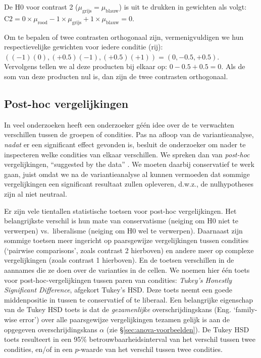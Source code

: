 \documentclass[
]{book}
\begin{document}
De H0 voor contrast 2 (\(\mu_\textrm{grijs} = \mu_\textrm{blauw}\)) is uit
te drukken in gewichten als volgt:
\(\textrm{C2} = 0\times \mu_\textrm{rood} -1 \times \mu_\textrm{grijs} +1 \times \mu_\textrm{blauw} = 0\).

Om te bepalen of twee contrasten orthogonaal zijn, vermenigvuldigen we
hun respectievelijke gewichten voor iedere conditie (rij):\\
\(( (-1)(0), (+0.5)(-1), (+0.5)(+1) )= (0, -0.5, +0.5)\).\\
Vervolgens tellen we al deze producten bij elkaar op:
\(0 -0.5 + 0.5 = 0\). Als de som van deze producten nul is, dan zijn de
twee contrasten orthogonaal.

\hypertarget{sec:anova-oneway-posthoc}{%
\subsection{Post-hoc vergelijkingen}\label{sec:anova-oneway-posthoc}}

In veel onderzoeken heeft een onderzoeker géén idee over de te
verwachten verschillen tussen de groepen of condities. Pas na afloop van
de variantieanalyse, \emph{nadat} er een significant effect gevonden is,
besluit de onderzoeker om nader te inspecteren welke condities van
elkaar verschillen. We spreken dan van \emph{post-hoc} vergelijkingen,
``suggested by the data'' \citep[ p.200]{MD04}. We moeten daarbij conservatief te
werk gaan, juist omdat we na de variantieanalyse al kunnen vermoeden dat
sommige vergelijkingen een significant resultaat zullen opleveren,
d.w.z., de nulhypotheses zijn al niet neutraal.

Er zijn vele tientallen statistische toetsen voor post-hoc
vergelijkingen. Het belangrijkste verschil is hun mate van conservatisme
(neiging om H0 niet te verwerpen) vs.~liberalisme (neiging om H0 wel te
verwerpen). Daarnaast zijn sommige toetsen meer ingericht op
paarsgewijze vergelijkingen tussen condities (`pairwise comparisons',
zoals contrast 2 hierboven) en andere meer op complexe vergelijkingen
(zoals contrast 1 hierboven). En de toetsen verschillen in de aannames
die ze doen over de varianties in de cellen. We noemen hier één toets
voor post-hoc-vergelijkingen tussen paren van condities: \emph{Tukey's
Honestly Significant Difference}, afgekort Tukey's HSD. Deze toets neemt
een goede middenpositie in tussen te conservatief of te liberaal. Een
belangrijke eigenschap van de Tukey HSD toets is dat de \emph{gezamenlijke}
overschrijdingskans (Eng. `family-wise error') over alle paarsgewijze
vergelijkingen tezamen gelijk is aan de opgegeven overschrijdingskans
\(\alpha\) (zie §\ref{sec:anova-voorbeelden}). De Tukey HSD toets resulteert in
een 95\% betrouwbaarheidsinterval van het verschil tussen twee condities,
en/of in een \(p\)-waarde van het verschil tussen twee condities.
\end{document}
